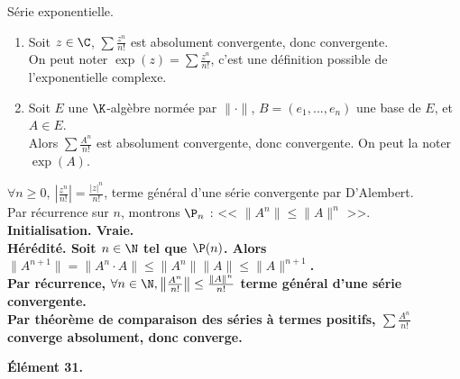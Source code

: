 \documentclass[11pt]{article}
\begin{document}
\begin{prop}{Série exponentielle.}{}
    \begin{enumerate}
        \item Soit $z\in\C$, $\sum\frac{z^n}{n!}$ est absolument convergente, donc convergente.\\
        On peut noter $\exp(z)=\sum\frac{z^n}{n!}$, c'est une définition possible de l'exponentielle complexe.
        \item Soit $E$ une $\K$-algèbre normée par $\|\cdot\|$, $B=(e_1,...,e_n)$ une base de $E$, et $A\in E$.\\
            Alors $\sum\frac{A^n}{n!}$ est absolument convergente, donc convergente. On peut la noter $\exp(A)$.
    \end{enumerate}
    \tcblower
     $\forall n \geq 0, ~ \left|\frac{z^n}{n!}\right| = \frac{|z|^n}{n!}$, terme général d'une série convergente par D'Alembert.\\
     Par récurrence sur $n$, montrons $\P_n$ : << $\|A^n\|\leq\|A\|^n$ >>.\\
    \bf{Initialisation.} Vraie.\\
    \bf{Hérédité.} Soit $n\in\N$ tel que $\P(n)$. Alors $\|A^{n+1}\|=\|A^n\cdot A\|\leq\|A^n\|\|A\|\leq \|A\|^{n+1}$.\\
    Par récurrence, $\forall n \in \N, \left\|\frac{A^n}{n!}\right\| \leq \frac{\|A\|^n}{n!}$ terme général d'une série convergente.\\
    Par théorème de comparaison des séries à \bf{termes positifs}, $\sum\frac{A^n}{n!}$ converge absolument, donc converge.
\end{prop}

\begin{center}
    \bf{Élément 31.}
\end{center}
\end{document}
